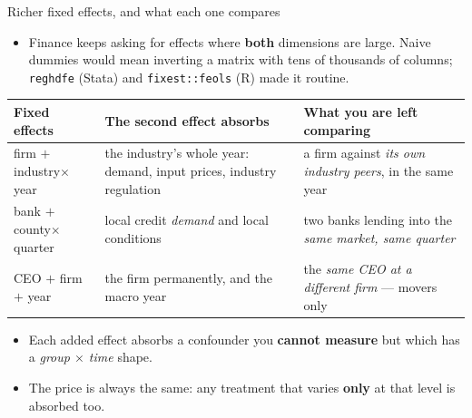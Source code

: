 \documentclass[
  11pt,
  ignorenonframetext,
  aspectratio=169,
]{beamer}
\providecommand{\tightlist}{%
  \setlength{\itemsep}{0pt}\setlength{\parskip}{0pt}}
\begin{document}
\begin{frame}[fragile]{Richer fixed effects, and what each one compares}
\protect{}\label{richer-fixed-effects-and-what-each-one-compares}
\begin{itemize}
\tightlist
\item
  Finance keeps asking for effects where \textbf{both} dimensions are
  large. Naive dummies would mean inverting a matrix with tens of
  thousands of columns; \texttt{reghdfe} (Stata) and
  \texttt{fixest::feols} (R) made it routine.
\end{itemize}

\begin{center}\scriptsize
\begin{tabular}{R{2.7cm}R{3.6cm}R{4.8cm}}
\toprule
Fixed effects & The second effect absorbs & What you are left comparing \\
\midrule
firm $+$ industry$\times$year & the industry's whole year: demand, input prices, industry regulation & a firm against \emph{its own industry peers}, in the same year \\[0.3em]
bank $+$ county$\times$quarter & local credit \emph{demand} and local conditions & two banks lending into the \emph{same market, same quarter} \\[0.3em]
CEO $+$ firm $+$ year & the firm permanently, and the macro year & the \emph{same CEO at a different firm} --- movers only \\
\bottomrule
\end{tabular}
\end{center}

\begin{itemize}
\tightlist
\item
  Each added effect absorbs a confounder you \textbf{cannot measure} but
  which has a \emph{group \(\times\) time} shape.
\item
  The price is always the same: any treatment that varies \textbf{only}
  at that level is absorbed too.
\end{itemize}
\end{frame}
\end{document}
